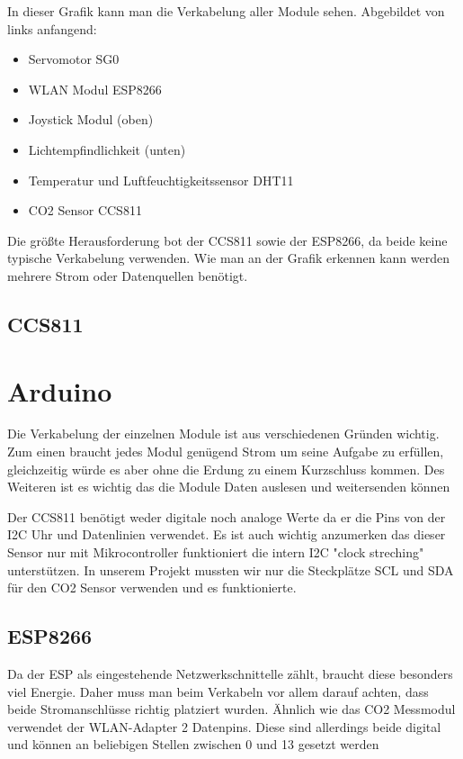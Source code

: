 In dieser Grafik kann man die Verkabelung aller Module sehen. Abgebildet von links anfangend:

\begin{itemize}
	\item Servomotor SG0
	\item WLAN Modul ESP8266
	\item Joystick Modul (oben)
	\item Lichtempfindlichkeit (unten)
	\item Temperatur und Luftfeuchtigkeitssensor DHT11
	\item CO2 Sensor CCS811
\end{itemize}

Die größte Herausforderung bot der CCS811 sowie der ESP8266, da beide keine typische Verkabelung verwenden. Wie man an der Grafik erkennen kann werden mehrere Strom oder Datenquellen benötigt.

\subsection{CCS811}

\section{Arduino}
Die Verkabelung der einzelnen Module ist aus verschiedenen Gründen wichtig. Zum einen braucht jedes Modul genügend Strom um seine Aufgabe zu erfüllen, gleichzeitig würde es aber ohne die Erdung zu einem Kurzschluss kommen. Des Weiteren ist es wichtig das die Module Daten auslesen und weitersenden können


Der CCS811 benötigt weder digitale noch analoge Werte da er die Pins von der I2C Uhr und Datenlinien verwendet. Es ist auch wichtig anzumerken das dieser Sensor nur mit Mikrocontroller funktioniert die intern I2C "clock streching" unterstützen. In unserem Projekt mussten wir nur die Steckplätze SCL und SDA für den CO2 Sensor verwenden und es funktionierte.

\subsection{ESP8266}

Da der ESP als eingestehende Netzwerkschnittelle zählt, braucht diese besonders viel Energie. Daher muss man beim Verkabeln vor allem darauf achten, dass beide Stromanschlüsse richtig platziert wurden. Ähnlich wie das CO2 Messmodul verwendet der WLAN-Adapter 2 Datenpins. Diese sind allerdings beide digital und können an beliebigen Stellen zwischen 0 und 13 gesetzt werden


